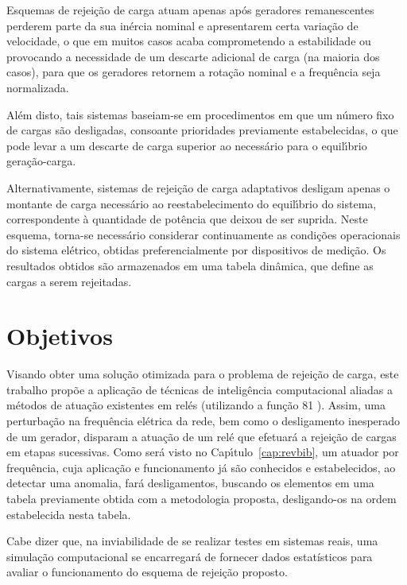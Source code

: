 Esquemas de rejei{\c c}{\~a}o de carga atuam apenas ap{\'o}s geradores remanescentes perderem parte da sua in{\'e}rcia nominal e apresentarem certa varia{\c c}{\~a}o de velocidade, o que em muitos casos acaba comprometendo a estabilidade ou provocando a necessidade de um descarte adicional de carga (na maioria dos casos), para que os geradores retornem a rota{\c c}{\~a}o nominal e a frequ{\^e}ncia seja normalizada.

Al{\'e}m disto, tais sistemas baseiam-se em procedimentos em que um n{\'u}mero fixo de cargas s{\~a}o desligadas, consoante prioridades previamente estabelecidas, o que pode levar a um descarte de carga superior ao necess{\'a}rio para o equil{\'\i}brio gera{\c c}{\~a}o-carga.

Alternativamente, sistemas de rejei{\c c}{\~a}o de carga adaptativos desligam apenas o montante de carga necess{\'a}rio ao reestabelecimento do equil{\'\i}brio do sistema, correspondente {\`a} quantidade de pot{\^e}ncia que deixou de ser suprida. Neste esquema, torna-se necess{\'a}rio considerar continuamente as condi{\c c}{\~o}es operacionais do sistema el{\'e}trico, obtidas preferencialmente por dispositivos de medi{\c c}{\~a}o. Os resultados obtidos s{\~a}o armazenados em uma tabela din{\^a}mica, que define as cargas a serem rejeitadas.

\section{Objetivos}\label{sec:prop}

Visando obter uma solu{\c c}{\~a}o otimizada para o problema de rejei{\c c}{\~a}o de carga, este trabalho prop{\~o}e a aplica{\c c}{\~a}o de t{\'e}cnicas de intelig{\^e}ncia computacional aliadas a m{\'e}todos de atua{\c c}{\~a}o existentes em rel{\'e}s (utilizando a fun{\c c}{\~a}o 81 \cite[Tabela~1.4 e Se{\c c}{\~a}o~3.9]{mamede2000proteccao}). Assim, uma perturba{\c c}{\~a}o na frequ{\^e}ncia el{\'e}trica da rede, bem como o desligamento inesperado de um gerador, disparam a atua{\c c}{\~a}o de um rel{\'e} que efetuar{\'a} a rejei{\c c}{\~a}o de cargas em etapas sucessivas. Como ser{\'a} visto no Cap{\'\i}tulo~\ref{cap:revbib}, um atuador por frequ{\^e}ncia, cuja aplica{\c c}{\~a}o e funcionamento j{\'a} s{\~a}o conhecidos e estabelecidos, ao detectar uma anomalia, far{\'a} desligamentos, buscando os elementos em uma tabela previamente obtida com a metodologia proposta, desligando-os na ordem estabelecida nesta tabela.

Cabe dizer que, na inviabilidade de se realizar testes em sistemas reais, uma simula{\c c}{\~a}o computacional se encarregar{\'a} de fornecer dados estat{\'i}sticos para avaliar o funcionamento do esquema de rejei{\c c}{\~a}o proposto.

